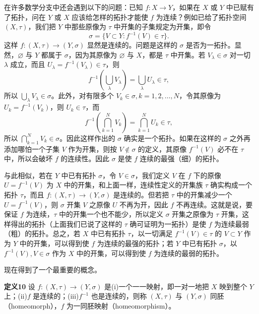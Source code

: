 在许多数学分支中还会遇到以下的问题：已知 $f:X\to Y$，如果在 $X$ 或 $Y$ 中已赋有了拓扑，问在 $Y$ 或 $X$ 应该给怎样的拓扑才能使 $f$ 为连续？例如已给了拓扑空间 $(X,\tau)$，我们把 $Y$ 中那些原像为 $\tau$ 中开集的子集规定为开集，即令
\[
 \sigma=\{V\subset Y:f^{-1}(V)\in\tau\}.
\]
这样 $f:(X,\tau)\to(Y,\sigma)$ 显然是连续的。问题是这样的 $\sigma$ 是否为一拓扑。显然，$\varnothing$ 与 $Y$ 都属于 $\sigma$，因为其原像为 $\varnothing$ 与 $X$，都是 $\tau$ 中开集。若 $V_\lambda\in\sigma$ 对一切 $\lambda$ 成立，而且 $U_\lambda=f^{-1}(V_\lambda)\in\tau$，则
\[
 f^{-1}\!\left(\bigcup_\lambda V_\lambda\right)=\bigcup_\lambda U_\lambda\in\tau,
\]
所以 $\bigcup_\lambda V_\lambda\in\sigma$。此外，对有限多个 $V_k\in\sigma,k=1,2,\ldots,N$，令其原像为 $U_k=f^{-1}(V_k)$，则 $U_k\in\tau$，而
\[
 f^{-1}\!\left(\bigcap_{k=1}^N V_k\right)=\bigcap_{k=1}^N U_k\in\tau,
\]
所以 $\bigcap_{k=1}^N V_k\in\sigma$。因此这样作出的 $\sigma$ 确实是一个拓扑。如果在这样的 $\sigma$ 之外再添加哪怕一个子集 $V$ 作为开集，则按 $V\notin\sigma$ 的定义，其原像 $f^{-1}(V)$ 必不在 $\tau$ 中，所以会破坏 $f$ 的连续性。因此 $\sigma$ 是使 $f$ 连续的最强（细）的拓扑。

与此相似，若在 $Y$ 中已有拓扑 $\sigma$，令 $V\in\sigma$，我们定义 $V$ 在 $f$ 下的原像 $U=f^{-1}(V)$ 为 $X$ 中的开集，和上面一样，连续性定义的开集族 $\tau$ 确实构成一个拓扑 $\tau$，而且 $f:(X,\tau)\to(Y,\sigma)$ 是连续的。但若把 $\tau$ 中的开集减少一个 $U=f^{-1}(V)$，则 $\sigma$ 开集 $V$ 之原像 $U$ 不再为开，因此 $f$ 不再连续。这就是说，要保证 $f$ 为连续，$\tau$ 中的开集一个也不能少，所以定义 $\sigma$ 开集之原像为 $\tau$ 开集，这样得出的拓扑（上面我们已说了这样的 $\tau$ 确可证明为一拓扑）是使 $f$ 为连续最弱（粗）的拓扑。总之，若 $X$ 中已有拓扑 $\tau$，以一切满足 $f^{-1}(V)\in\tau$ 的 $V\subset Y$ 作为 $Y$ 中的开集，可以得到使 $f$ 为连续的最强的拓扑；若 $Y$ 中已有拓扑 $\sigma$，以 $f^{-1}(V),V\in\sigma$ 作为 $X$ 中的开集，可以得到使 $f$ 为连续的最弱的拓扑。

现在得到了一个最重要的概念。

\noindent\textbf{定义10}\quad
设 $f:(X,\tau)\to(Y,\sigma)$ 是(i)一个一一映射，即一对一地把 $X$ 映到整个 $Y$ 上；(ii)$f$ 是连续的；(iii)$f^{-1}$ 也是连续的，则称 $(X,\tau)$ 与 $(Y,\sigma)$ 同胚（homeomorph），$f$ 为一同胚映射（homeomorphism）。

